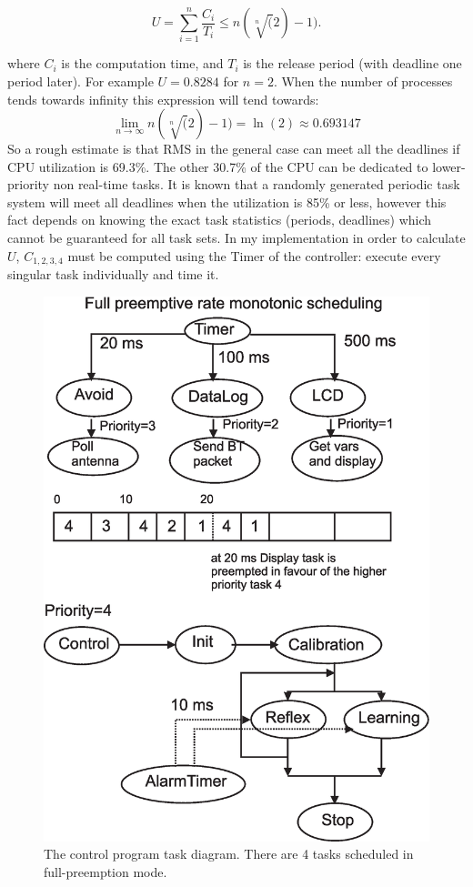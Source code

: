 \begin{equation}
U=\sum_{i=1}^{n}\frac{C_{i}}{T_{i}} \leq n(\sqrt[n](2)-1).
\end{equation}

where $C_{i}$ is the computation time, and $T_{i}$ is the release period (with deadline one period later). For example $U = 0.8284$ for $n = 2$. When the number of processes tends towards infinity this expression will tend towards:
\begin{equation}
\lim_{n \rightarrow \infty} n(\sqrt[n](2)-1)=\ln(2) \approx 0.693147
\end{equation}
So a rough estimate is that RMS in the general case can meet all the deadlines if CPU utilization is 69.3\%. The other 30.7\% of the CPU can be dedicated to lower-priority non real-time tasks. It is known that a randomly generated periodic task system will meet all deadlines when the utilization is 85\% or less, however this fact depends on knowing the exact task statistics (periods, deadlines) which cannot be guaranteed for all task sets.
In my implementation in order to calculate $U$, $C_{1,2,3,4}$ must be computed using the Timer of the controller: execute every singular task individually and time it.
\begin{figure}[htbp]
\begin{center}
\includegraphics[scale=0.4]{figures/nxtosek/TaskLejos.eps}
\caption[Controller task allocation]{The control program task diagram.
There are 4 tasks scheduled in full-preemption mode. \label{nxtOsek:task}}
\end{center}
\end{figure}

